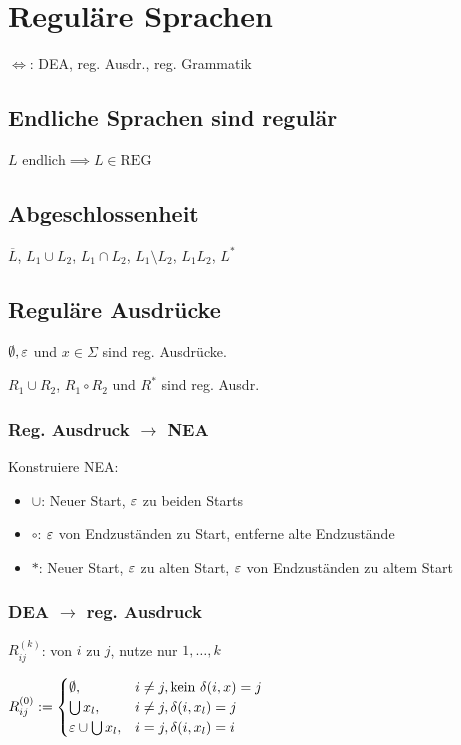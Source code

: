\section*{Reguläre Sprachen}
$\iff$: DEA, reg. Ausdr., reg. Grammatik

\subsection*{Endliche Sprachen sind regulär}
$L \text{ endlich} \implies L \in \text{REG}$

\subsection*{Abgeschlossenheit}
$\overline{L}$, $L_1 \cup L_2$, $L_1 \cap L_2$, $L_1 \setminus L_2$, $L_1 L_2$, $L^*$

\subsection*{Reguläre Ausdrücke}
$\emptyset, \varepsilon$ und $x \in \Sigma$ sind reg. Ausdrücke.

$R_1 \cup R_2$, $R_1 \circ R_2$ und $R^*$ sind reg. Ausdr.

\subsubsection*{Reg. Ausdruck $\longrightarrow$ NEA}
Konstruiere NEA:
\begin{itemize}
	\item $\cup$: Neuer Start, $\varepsilon$ zu beiden Starts
	\item $\circ$: $\varepsilon$ von Endzuständen zu Start,
		entferne alte Endzustände
	\item $*$: Neuer Start, $\varepsilon$ zu alten Start, $\varepsilon$ von Endzuständen zu altem Start
\end{itemize}

\subsubsection*{DEA $\longrightarrow$ reg. Ausdruck}
$R_{ij}^{(k)}$: von $i$ zu $j$, nutze nur $1,\ldots,k$

$\displaystyle
	R_{ij}^{(0)} := \begin{cases}
		\emptyset, & i \neq j, \text{kein $\delta(i,x)=j$} \\
		\bigcup x_l, & i \neq j, \delta(i,x_l)=j \\
		\varepsilon \cup \bigcup x_l, & i = j, \delta(i, x_l) = i  \\
	\end{cases}
$


